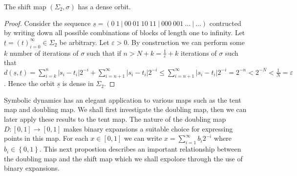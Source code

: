 \begin{prop} \label{prop:shift-map-dense-orbit}
    The shift map $(\Sigma_2, \sigma)$ has a dense orbit.
    \begin{proof}
        Consider the sequence $\underline{s} = (0\ 1\ |\ 00\ 01\ 10\ 11\ |\ 000\ 001\ \dots\ |\ \dots)$ contructed by writing down all possible combinations of blocks of length one to infinity. Let $\underline{t} = (t)_{i=0}^{\infty} \in \Sigma_2$ be arbitrary. Let $\varepsilon > 0$. By construction we can perform some $k$ number of iterations of $\sigma$ such that if $n > N + k = \frac{1}{\varepsilon} + k$ iterations of $\sigma$ such that $d(\underline{s}, \underline{t}) = \sum_{i = k}^{n}|s_i - t_i|2^{-i} + \sum_{i = n+1}^{\infty}|s_i - t_i|2^{-i} \leq \sum_{i = n+1}^{\infty}|s_i - t_i|2^{-i} = 2^{-n} < 2^{-N} < \frac{1}{N} = \varepsilon$. Hence the orbit $\underline{s}$ is dense in $\Sigma_2$.
    \end{proof}
\end{prop}

Symbolic dynamics has an elegant application to various maps such as the tent map and doubling map. We shall first investigate the doubling map, then we can later apply these results to the tent map. The nature of the doubling map $D: [0, 1] \to [0, 1]$ makes binary expansions a suitable choice for expressing points in this map. For each $x \in [0, 1]$ we can write $x=\sum_{i=1}^{\infty}b_i2^{-i}$ where $b_i \in \left\lbrace 0, 1 \right\rbrace$. This next propostion describes an important relationship between the doubling map and the shift map which we shall expolore through the use of binary expansions.

